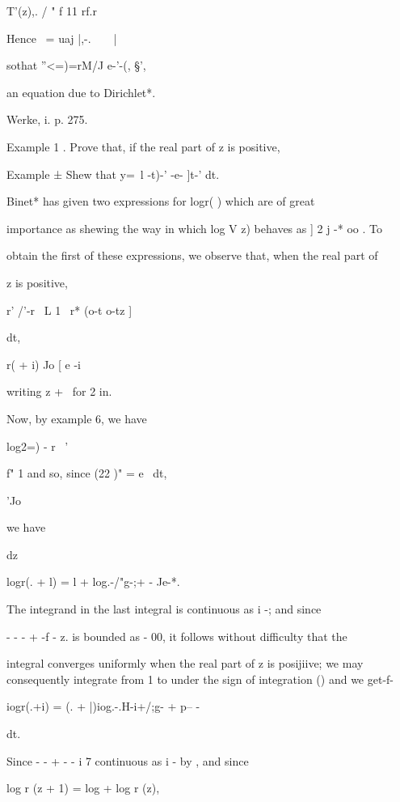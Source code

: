 T'(z),. / " f 11 rf.r

Hence \ = uaj |,-.\ \ \ \ |\,

sothat ''<=)=rM/J e-'-(, §',

an equation due to Dirichlet*.

Werke, i. p. 275.

%
%

Example 1 . Prove that, if the real part of z is positive,

Example ± Shew that y=\ l -t)-' -e- ]t-' dt. 


Binet* has given two expressions for logr( ) which are of
great

importance as shewing the way in which log V z) behaves as ] 2 j -* oo
. To

obtain the first of these expressions, we observe that, when the real
part of

z is positive,

r' /'-r \ L 1 \ r* (o-t o-tz ]

dt,

r( + i) Jo [ e -i

writing z + \ for 2 in.

Now, by example 6, we have

log2=) - r~ '

f" 1 and so, since (22 )" = e~ dt,

'Jo

we have

dz

logr(. + l) = l + log.-/"g-;+ - Je-*.

The integrand in the last integral is continuous as i -; and since

- - - + -f - z. is bounded as - 00, it follows without difficulty
that the

integral converges uniformly when the real part of z is posijiive; we
may consequently integrate from 1 to under the sign of integration
() and we get-f-

iogr(.+i) = (. + |)iog.-.H-i+/;g- + p-- -

dt.

Since - - + - - i 7 continuous as i - by , and since

log r (z + 1) = log + log r (z),


